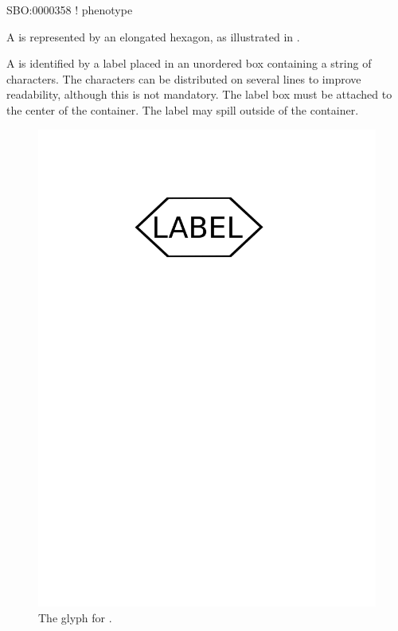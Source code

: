 \begin{glyphDescription}

\glyphSboTerm SBO:0000358 ! phenotype

\glyphContainer A  is represented by an elongated
hexagon, as illustrated in .

\glyphLabel A  is identified by a label placed in an
unordered box containing a string of characters.  The characters can be
distributed on several lines to improve readability, although this is not
mandatory.  The label box must be attached to the center of the
 container.  The label may spill outside of the container.
\end{glyphDescription}

\begin{figure}[htb]
  \centering
  \includegraphics[scale = 0.3]{images/phenotype}
  \caption{The \PD glyph for .}
  \label{fig:techref:phenotype}
\end{figure}


